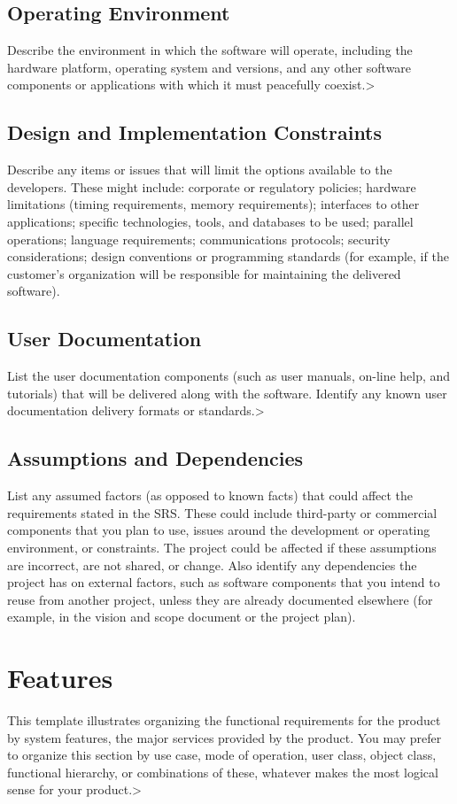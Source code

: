 \documentclass{scrreprt}
\begin{document}
    \section{Operating Environment}
    Describe the environment in which the software will operate, including the hardware platform, operating system and versions, and any other software components or applications with which it must peacefully coexist.>
    \section{Design and Implementation Constraints}
    Describe any items or issues that will limit the options available to the developers. These might include: corporate or regulatory policies; hardware limitations (timing requirements, memory requirements); interfaces to other applications; specific technologies, tools, and databases to be used; parallel operations; language requirements; communications protocols; security considerations; design conventions or programming standards (for example, if the customer’s organization will be responsible for maintaining the delivered software).
    \section{User Documentation}
    List the user documentation components (such as user manuals, on-line help, and tutorials) that will be delivered along with the software. Identify any known user documentation delivery formats or standards.>
    \section{Assumptions and Dependencies}
    List any assumed factors (as opposed to known facts) that could affect the requirements stated in the SRS. These could include third-party or commercial components that you plan to use, issues around the development or operating environment, or constraints. The project could be affected if these assumptions are incorrect, are not shared, or change. Also identify any dependencies the project has on external factors, such as software components that you intend to reuse from another project, unless they are already documented elsewhere (for example, in the vision and scope document or the project plan).
     
    \chapter{Features} 
    This template illustrates organizing the functional requirements for the product by system features, the major services provided by the product. You may prefer to organize this section by use case, mode of operation, user class, object class, functional hierarchy, or combinations of these, whatever makes the most logical sense for your product.>
\end{document}

